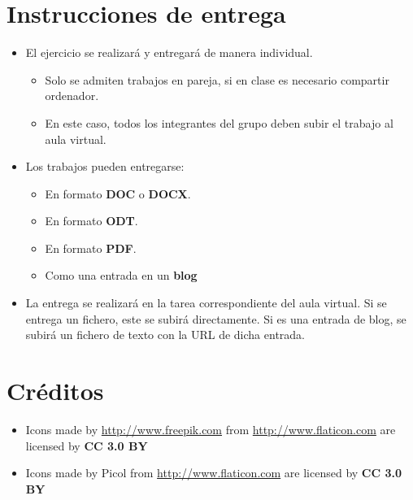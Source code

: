 \section{Instrucciones de entrega}
\begin{itemize}
\item El ejercicio se realizará y entregará de manera individual.
  \begin{itemize}
  \item Solo se admiten trabajos en pareja, si en clase es necesario compartir ordenador.
  \item En este caso, todos los integrantes del grupo deben subir el trabajo al aula virtual.

  \end{itemize}
\item Los trabajos pueden entregarse:
  \begin{itemize}
  \item En formato \textbf{DOC} o \textbf{DOCX}.
  \item En formato \textbf{ODT}.
  \item En formato \textbf{PDF}. 
  \item Como una entrada en un \textbf{blog}

  \end{itemize}
  
\item La entrega se realizará en la tarea correspondiente del aula virtual. Si se entrega un fichero, este se subirá directamente. Si es una entrada de blog, se subirá un fichero de texto con la URL de dicha entrada.
\end{itemize}  

\section{Créditos}
\begin{itemize}
\item Icons made by \url{http://www.freepik.com} from \url{http://www.flaticon.com} are licensed by \textbf{CC 3.0 BY}
\item Icons made by Picol from \url{http://www.flaticon.com} are licensed by \textbf{CC 3.0 BY}
\end{itemize}

